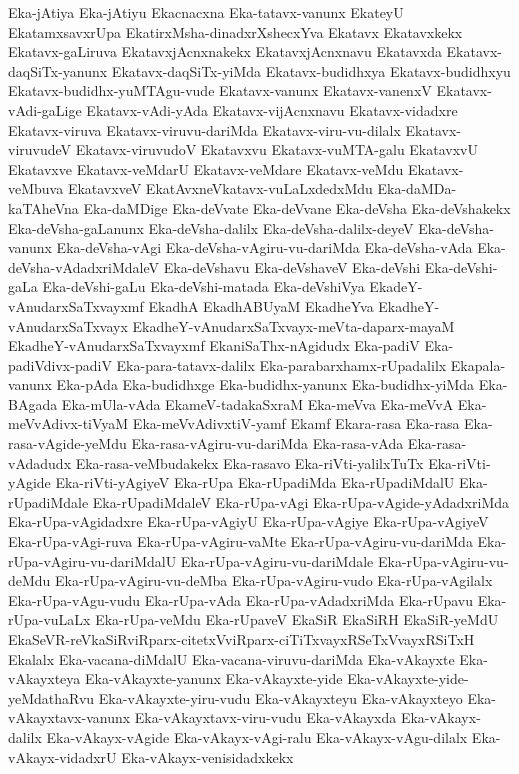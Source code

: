 {Eka-jAtiya
Eka-jAtiyu
Ekacnacxna
Eka-tatavx-vanunx
EkateyU
EkatamxsavxrUpa
EkatirxMsha-dinadxrXshecxYva
Ekatavx
Ekatavxkekx
Ekatavx-gaLiruva
EkatavxjAcnxnakekx
EkatavxjAcnxnavu
Ekatavxda
Ekatavx-daqSiTx-yanunx
Ekatavx-daqSiTx-yiMda
Ekatavx-budidhxya
Ekatavx-budidhxyu
Ekatavx-budidhx-yuMTAgu-vude
Ekatavx-vanunx
Ekatavx-vanenxV
Ekatavx-vAdi-gaLige
Ekatavx-vAdi-yAda
Ekatavx-vijAcnxnavu
Ekatavx-vidadxre
Ekatavx-viruva
Ekatavx-viruvu-dariMda
Ekatavx-viru-vu-dilalx
Ekatavx-viruvudeV
Ekatavx-viruvudoV
Ekatavxvu
Ekatavx-vuMTA-galu
EkatavxvU
Ekatavxve
Ekatavx-veMdarU
Ekatavx-veMdare
Ekatavx-veMdu
Ekatavx-veMbuva
EkatavxveV
EkatAvxneVkatavx-vuLaLxdedxMdu
Eka-daMDa-kaTAheVna
Eka-daMDige
Eka-deVvate
Eka-deVvane
Eka-deVsha
Eka-deVshakekx
Eka-deVsha-gaLanunx
Eka-deVsha-dalilx
Eka-deVsha-dalilx-deyeV
Eka-deVsha-vanunx
Eka-deVsha-vAgi
Eka-deVsha-vAgiru-vu-dariMda
Eka-deVsha-vAda
Eka-deVsha-vAdadxriMdaleV
Eka-deVshavu
Eka-deVshaveV
Eka-deVshi
Eka-deVshi-gaLa
Eka-deVshi-gaLu
Eka-deVshi-matada
Eka-deVshiVya
EkadeY-vAnudarxSaTxvayxmf
EkadhA
EkadhABUyaM
EkadheYva
EkadheY-vAnudarxSaTxvayx
EkadheY-vAnudarxSaTxvayx-meVta-daparx-mayaM
EkadheY-vAnudarxSaTxvayxmf
EkaniSaThx-nAgidudx
Eka-padiV
Eka-padiVdivx-padiV
Eka-para-tatavx-dalilx
Eka-parabarxhamx-rUpadalilx
Ekapala-vanunx
Eka-pAda
Eka-budidhxge
Eka-budidhx-yanunx
Eka-budidhx-yiMda
Eka-BAgada
Eka-mUla-vAda
EkameV-tadakaSxraM
Eka-meVva
Eka-meVvA
Eka-meVvAdivx-tiVyaM
Eka-meVvAdivxtiV-yamf
Ekamf
Ekara-rasa
Eka-rasa
Eka-rasa-vAgide-yeMdu
Eka-rasa-vAgiru-vu-dariMda
Eka-rasa-vAda
Eka-rasa-vAdadudx
Eka-rasa-veMbudakekx
Eka-rasavo
Eka-riVti-yalilxTuTx
Eka-riVti-yAgide
Eka-riVti-yAgiyeV
Eka-rUpa
Eka-rUpadiMda
Eka-rUpadiMdalU
Eka-rUpadiMdale
Eka-rUpadiMdaleV
Eka-rUpa-vAgi
Eka-rUpa-vAgide-yAdadxriMda
Eka-rUpa-vAgidadxre
Eka-rUpa-vAgiyU
Eka-rUpa-vAgiye
Eka-rUpa-vAgiyeV
Eka-rUpa-vAgi-ruva
Eka-rUpa-vAgiru-vaMte
Eka-rUpa-vAgiru-vu-dariMda
Eka-rUpa-vAgiru-vu-dariMdalU
Eka-rUpa-vAgiru-vu-dariMdale
Eka-rUpa-vAgiru-vu-deMdu
Eka-rUpa-vAgiru-vu-deMba
Eka-rUpa-vAgiru-vudo
Eka-rUpa-vAgilalx
Eka-rUpa-vAgu-vudu
Eka-rUpa-vAda
Eka-rUpa-vAdadxriMda
Eka-rUpavu
Eka-rUpa-vuLaLx
Eka-rUpa-veMdu
Eka-rUpaveV
EkaSiR
EkaSiRH
EkaSiR-yeMdU
EkaSeVR-reVkaSiRviRparx-citetxVviRparx-ciTiTxvayxRSeTxVvayxRSiTxH
Ekalalx
Eka-vacana-diMdalU
Eka-vacana-viruvu-dariMda
Eka-vAkayxte
Eka-vAkayxteya
Eka-vAkayxte-yanunx
Eka-vAkayxte-yide
Eka-vAkayxte-yide-yeMdathaRvu
Eka-vAkayxte-yiru-vudu
Eka-vAkayxteyu
Eka-vAkayxteyo
Eka-vAkayxtavx-vanunx
Eka-vAkayxtavx-viru-vudu
Eka-vAkayxda
Eka-vAkayx-dalilx
Eka-vAkayx-vAgide
Eka-vAkayx-vAgi-ralu
Eka-vAkayx-vAgu-dilalx
Eka-vAkayx-vidadxrU
Eka-vAkayx-venisidadxkekx
}
